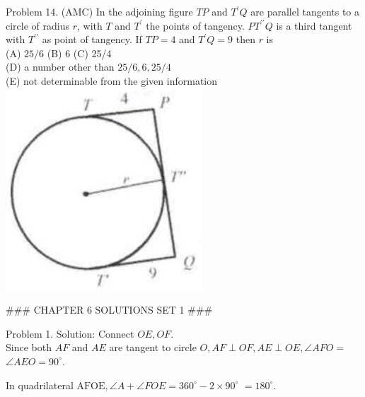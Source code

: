 \documentclass[10pt]{article}
\begin{document}
Problem 14. (AMC) In the adjoining figure \(T P\) and \(T^{\prime} Q\) are parallel tangents to a circle of radius \(r\), with \(T\) and \(T^{\prime}\) the points of tangency. \(P T^{\prime \prime} Q\) is a third tangent with \(T^{\prime \prime}\) as point of tangency. If \(T P=4\) and \(T^{\prime} Q=9\) then \(r\) is\\
(A) \(25 / 6\) (B) 6 (C) 25/4\\
(D) a number other than \(25 / 6,6,25 / 4\)\\
(E) not determinable from the given information\\
\includegraphics[max width=\textwidth, center]{2025_04_17_97bc1f7e44d93c271a88g-156(2)}


### CHAPTER 6 SOLUTIONS SET 1 ###

Problem 1. Solution:
Connect \(O E, O F\).\\
Since both \(A F\) and \(A E\) are tangent to circle \(O, A F \perp O F, A E \perp O E, \angle A F O=\) \(\angle A E O=90^{\circ}\).

In quadrilateral \(\mathrm{AFOE}, \angle A+\angle F O E=360^{\circ}-2 \times 90^{\circ}\) \(=180^{\circ}\).
\end{document}
